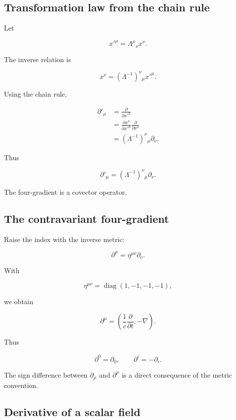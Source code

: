 \subsection{Transformation law from the chain rule}

Let

\[
x'^{\mu}
=
\Lambda^{\mu}{}_{\nu}x^{\nu}.
\]

The inverse relation is

\[
x^{\nu}
=
(\Lambda^{-1})^{\nu}{}_{\mu}x'^{\mu}.
\]

Using the chain rule,

\[
\begin{aligned}
\partial'_{\mu}
&=
\frac{\partial}{\partial x'^{\mu}}\\
&=
\frac{\partial x^{\nu}}
{\partial x'^{\mu}}
\frac{\partial}{\partial x^{\nu}}\\
&=
(\Lambda^{-1})^{\nu}{}_{\mu}
\partial_{\nu}.
\end{aligned}
\]

Thus

\[
\boxed{
\partial'_{\mu}
=
(\Lambda^{-1})^{\nu}{}_{\mu}
\partial_{\nu}
}.
\]

The four-gradient is a covector operator.

\subsection{The contravariant four-gradient}

Raise the index with the inverse metric:

\[
\boxed{
\partial^{\mu}
=
\eta^{\mu\nu}\partial_{\nu}
}.
\]

With

\[
\eta^{\mu\nu}
=
\operatorname{diag}(1,-1,-1,-1),
\]

we obtain

\[
\boxed{
\partial^{\mu}
=
\left(
\frac{1}{c}\frac{\partial}{\partial t},
-\nabla
\right)
}.
\]

Thus

\[
\partial^{0}=\partial_{0},
\qquad
\partial^{i}=-\partial_{i}.
\]

The sign difference between \(\partial_{\mu}\) and \(\partial^{\mu}\) is a direct consequence of the metric convention.

\subsection{Derivative of a scalar field}

